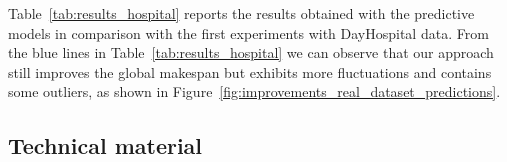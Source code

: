 \documentclass{article}
\newcommand{\act}[1]{\textsf{\footnotesize #1}}
\begin{document}
Table~\ref{tab:results_hospital} reports the results obtained with the predictive models in comparison with the first experiments with DayHospital data. From the blue lines in Table~\ref{tab:results_hospital} we can observe that our approach still improves the global makespan but exhibits more fluctuations and contains some outliers, as shown in  Figure~\ref{fig:improvements_real_dataset_predictions}.

\subsection*{Technical material}
\end{document}

